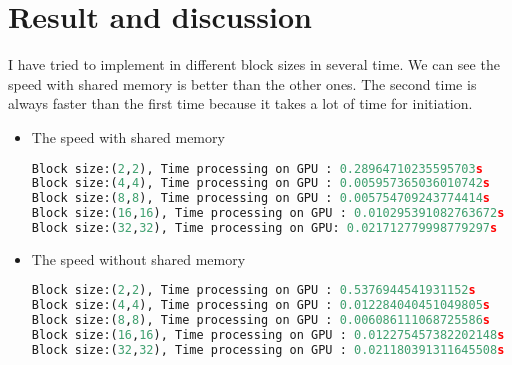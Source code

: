 \documentclass[12pt]{article}
\begin{document}
\section{Result and discussion}
I have tried to implement in different block sizes in several time. 
We can see the speed with shared memory is better than the other ones.
The second time is always faster than the first time because it takes a lot of time for initiation.

\begin{itemize}
    \item The speed with shared memory
    \begin{lstlisting}[language=Python]
Block size:(2,2), Time processing on GPU : 0.28964710235595703s
Block size:(4,4), Time processing on GPU : 0.005957365036010742s
Block size:(8,8), Time processing on GPU : 0.005754709243774414s
Block size:(16,16), Time processing on GPU : 0.010295391082763672s
Block size:(32,32), Time processing on GPU: 0.021712779998779297s
\end{lstlisting}
    \item  The speed without shared memory
    \begin{lstlisting}[language=Python]
Block size:(2,2), Time processing on GPU : 0.5376944541931152s
Block size:(4,4), Time processing on GPU : 0.012284040451049805s
Block size:(8,8), Time processing on GPU : 0.006086111068725586s
Block size:(16,16), Time processing on GPU : 0.012275457382202148s
Block size:(32,32), Time processing on GPU : 0.021180391311645508s
\end{lstlisting}

\end{itemize}
\end{document}
